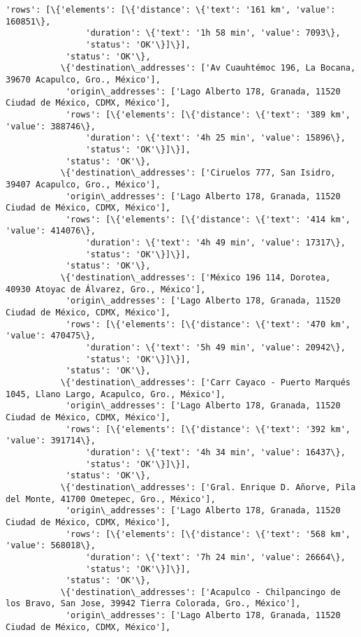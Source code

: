 \documentclass[11pt]{article}
\begin{document}
\begin{Verbatim}[commandchars=\\\{\}]
            'rows': [\{'elements': [\{'distance': \{'text': '161 km', 'value': 160851\},
                'duration': \{'text': '1h 58 min', 'value': 7093\},
                'status': 'OK'\}]\}],
            'status': 'OK'\},
           \{'destination\_addresses': ['Av Cuauhtémoc 196, La Bocana, 39670 Acapulco, Gro., México'],
            'origin\_addresses': ['Lago Alberto 178, Granada, 11520 Ciudad de México, CDMX, México'],
            'rows': [\{'elements': [\{'distance': \{'text': '389 km', 'value': 388746\},
                'duration': \{'text': '4h 25 min', 'value': 15896\},
                'status': 'OK'\}]\}],
            'status': 'OK'\},
           \{'destination\_addresses': ['Ciruelos 777, San Isidro, 39407 Acapulco, Gro., México'],
            'origin\_addresses': ['Lago Alberto 178, Granada, 11520 Ciudad de México, CDMX, México'],
            'rows': [\{'elements': [\{'distance': \{'text': '414 km', 'value': 414076\},
                'duration': \{'text': '4h 49 min', 'value': 17317\},
                'status': 'OK'\}]\}],
            'status': 'OK'\},
           \{'destination\_addresses': ['México 196 114, Dorotea, 40930 Atoyac de Álvarez, Gro., México'],
            'origin\_addresses': ['Lago Alberto 178, Granada, 11520 Ciudad de México, CDMX, México'],
            'rows': [\{'elements': [\{'distance': \{'text': '470 km', 'value': 470475\},
                'duration': \{'text': '5h 49 min', 'value': 20942\},
                'status': 'OK'\}]\}],
            'status': 'OK'\},
           \{'destination\_addresses': ['Carr Cayaco - Puerto Marqués 1045, Llano Largo, Acapulco, Gro., México'],
            'origin\_addresses': ['Lago Alberto 178, Granada, 11520 Ciudad de México, CDMX, México'],
            'rows': [\{'elements': [\{'distance': \{'text': '392 km', 'value': 391714\},
                'duration': \{'text': '4h 34 min', 'value': 16437\},
                'status': 'OK'\}]\}],
            'status': 'OK'\},
           \{'destination\_addresses': ['Gral. Enrique D. Añorve, Pila del Monte, 41700 Ometepec, Gro., México'],
            'origin\_addresses': ['Lago Alberto 178, Granada, 11520 Ciudad de México, CDMX, México'],
            'rows': [\{'elements': [\{'distance': \{'text': '568 km', 'value': 568018\},
                'duration': \{'text': '7h 24 min', 'value': 26664\},
                'status': 'OK'\}]\}],
            'status': 'OK'\},
           \{'destination\_addresses': ['Acapulco - Chilpancingo de los Bravo, San Jose, 39942 Tierra Colorada, Gro., México'],
            'origin\_addresses': ['Lago Alberto 178, Granada, 11520 Ciudad de México, CDMX, México'],

\end{Verbatim}
\end{document}
